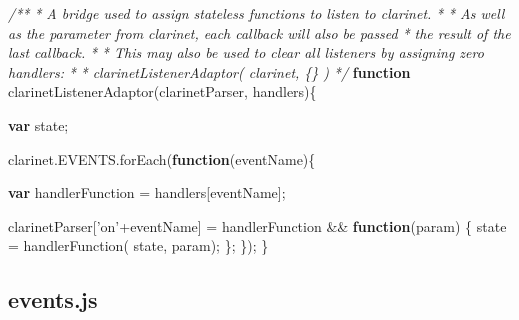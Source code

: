 \documentclass[12pt, ]{article}
\newenvironment{Shaded}{}{}
\newcommand{\KeywordTok}[1]{\textcolor[rgb]{0.00,0.44,0.13}{\textbf{{#1}}}}
\newcommand{\StringTok}[1]{\textcolor[rgb]{0.25,0.44,0.63}{{#1}}}
\newcommand{\CommentTok}[1]{\textcolor[rgb]{0.38,0.63,0.69}{\textit{{#1}}}}
\newcommand{\OtherTok}[1]{\textcolor[rgb]{0.00,0.44,0.13}{{#1}}}
\newcommand{\FunctionTok}[1]{\textcolor[rgb]{0.02,0.16,0.49}{{#1}}}
\newcommand{\NormalTok}[1]{{#1}}
\begin{document}
\begin{Shaded}
\begin{Highlighting}[]

\CommentTok{/** }
\CommentTok{ * A bridge used to assign stateless functions to listen to clarinet.}
\CommentTok{ * }
\CommentTok{ * As well as the parameter from clarinet, each callback will also be passed}
\CommentTok{ * the result of the last callback.}
\CommentTok{ * }
\CommentTok{ * This may also be used to clear all listeners by assigning zero handlers:}
\CommentTok{ * }
\CommentTok{ *    clarinetListenerAdaptor( clarinet, \{\} )}
\CommentTok{ */}
\KeywordTok{function} \FunctionTok{clarinetListenerAdaptor}\NormalTok{(clarinetParser, handlers)\{}
    
   \KeywordTok{var} \NormalTok{state;}

   \OtherTok{clarinet}\NormalTok{.}\OtherTok{EVENTS}\NormalTok{.}\FunctionTok{forEach}\NormalTok{(}\KeywordTok{function}\NormalTok{(eventName)\{}
 
      \KeywordTok{var} \NormalTok{handlerFunction = handlers[eventName];}
      
      \NormalTok{clarinetParser[}\StringTok{'on'}\NormalTok{+eventName] = handlerFunction && }
                                       \KeywordTok{function}\NormalTok{(param) \{}
                                          \NormalTok{state = }\FunctionTok{handlerFunction}\NormalTok{( state, param);}
                                       \NormalTok{\};}
   \NormalTok{\});}
\NormalTok{\}}
\end{Highlighting}
\end{Shaded}

\pagebreak

\subsection{events.js}\label{headerux5fevents}

\label{src_events}
\end{document}
